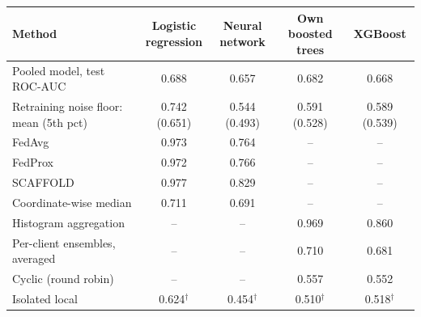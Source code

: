 \begin{tabular}{lcccc}
\toprule
Method & \makecell{Logistic\\regression} & \makecell{Neural\\network} & \makecell{Own boosted\\trees} & XGBoost \\
\midrule
Pooled model, test ROC-AUC & 0.688 & 0.657 & 0.682 & 0.668 \\
Retraining noise floor: mean (5th pct) & 0.742 (0.651) & 0.544 (0.493) & 0.591 (0.528) & 0.589 (0.539) \\
\midrule
FedAvg & 0.973 & 0.764 & -- & -- \\
FedProx & 0.972 & 0.766 & -- & -- \\
SCAFFOLD & 0.977 & 0.829 & -- & -- \\
Coordinate-wise median & 0.711 & 0.691 & -- & -- \\
Histogram aggregation & -- & -- & 0.969 & 0.860 \\
Per-client ensembles, averaged & -- & -- & 0.710 & 0.681 \\
Cyclic (round robin) & -- & -- & 0.557 & 0.552 \\
Isolated local & 0.624$^\dagger$ & 0.454$^\dagger$ & 0.510$^\dagger$ & 0.518$^\dagger$ \\
\bottomrule
\end{tabular}
